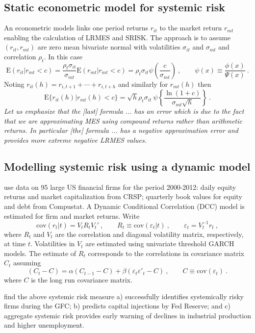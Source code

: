\documentclass[authoryear]{elsarticle}
\newcommand{\E}{\mathrm{E}}
\newcommand{\cov}{\mathrm{cov}}
\newcommand{\cq}{\ , \qquad}
\begin{document}
\subsection{Static econometric model for systemic risk}

An econometric models  links one period returns $r_{it}$  to the  market return $r_{mt}$ enabling  the calculation of 
LRMES and SRISK.   The approach is to assume $(r_{it},r_{mt})$ are zero mean bivariate normal with volatilities $\sigma_{it}$ and $\sigma_{mt}$ and correlation $\rho_t$.  In this case
$$
\E(r_{it}|r_{mt}<c) = \frac{\rho_t\sigma_{it}}{\sigma_{mt}}\E(r_{mt}|r_{mt}<c)  = \rho_t\sigma_{it}\psi\left(\frac{c}{\sigma_{mt}}\right)\cq \psi(x)\equiv\frac{\phi(x)}{\Psi(x)}\ .
$$
Noting $r_{it}(h)=r_{i,t+1}+\cdots+r_{i,t+h}$ and similarly for $r_{mt}(h)$ then 
$$
\E\{r_{it}(h)|r_{mt}(h)<c\}  = \sqrt{h}\rho_t\sigma_{it}\ \psi\left\{\frac{\ln(1+c)}{\sigma_{mt}\sqrt h}\right\}\ .
$$
{\it Let us emphasize that the [last] formula ... has an error which is due to the fact that we are approximating MES using compound returns rather than arithmetic returns.    In particular [the] formula ... has a negative approximation error  and provides more extreme negative LRMES values.}

\subsection{Modelling systemic risk using a dynamic model}

\cite{brownlees2015} use  data on 95 large US financial firms for the period 2000-2012:   daily equity returns and market capitalization from CRSP; quarterly book values for equity and debt from Compustat.   A   Dynamic Conditional Correlation (DCC) model is estimated for  firm and market returns.  Write
\newcommand{\veps}{\varepsilon}
$$
\cov (r_t|t) = V_tR_tV_t'\cq R_t\equiv \cov(\veps_t|t)\cq \veps_t=V_t^{-1}r_t\ ,
$$
where $R_t$ and  $V_t$  are the correlation and diagonal volatility matrix, respectively, at time $t$.   Volatilities in $V_t$  are estimated using univariate threshold GARCH models.  The estimate of $R_t$ corresponds to the correlations in covariance matrix $C_t$ assuming
$$
(C_t - C) = \alpha (C_{t-1}-C)+\beta (\veps_t\veps'_t-C) \cq C\equiv\cov(\veps_t)\ .
$$
where $C$ is the long run covariance matrix.

\cite{brownlees2015} find the above systemic risk measure  a)  successfully identifies systemically risky firms during the GFC;
b)  predicts capital injections by Fed Reserve; and c) aggregate systemic risk provides early warning of declines in industrial production and higher unemployment.
\end{document}
